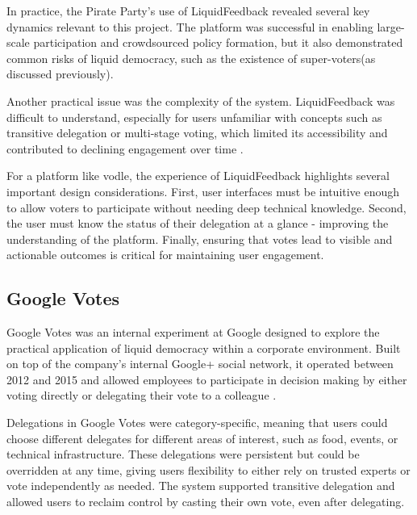 In practice, the Pirate Party's use of LiquidFeedback revealed several key dynamics relevant to this project. The platform was successful in enabling large-scale participation and crowdsourced policy formation, but it also demonstrated common risks of liquid democracy, such as the existence of super-voters(as discussed previously).

Another practical issue was the complexity of the system. LiquidFeedback was difficult to understand, especially for users unfamiliar with concepts such as transitive delegation or multi-stage voting, which limited its accessibility and contributed to declining engagement over time \citep{kling2015votingbehaviourpoweronline}.

For a platform like vodle, the experience of LiquidFeedback highlights several important design considerations. First, user interfaces must be intuitive enough to allow voters to participate without needing deep technical knowledge. Second, the user must know the status of their delegation at a glance - improving the understanding of the platform. Finally, ensuring that votes lead to visible and actionable outcomes is critical for maintaining user engagement.

\subsection{Google Votes}\label{subsec:google_votes}
Google Votes was an internal experiment at Google designed to explore the practical application of liquid democracy within a corporate environment. Built on top of the company's internal Google+ social network, it operated between 2012 and 2015 and allowed employees to participate in decision making by either voting directly or delegating their vote to a colleague \citep{hardt_google_2015}.

Delegations in Google Votes were category-specific, meaning that users could choose different delegates for different areas of interest, such as food, events, or technical infrastructure. These delegations were persistent but could be overridden at any time, giving users flexibility to either rely on trusted experts or vote independently as needed. The system supported transitive delegation and allowed users to reclaim control by casting their own vote, even after delegating.

